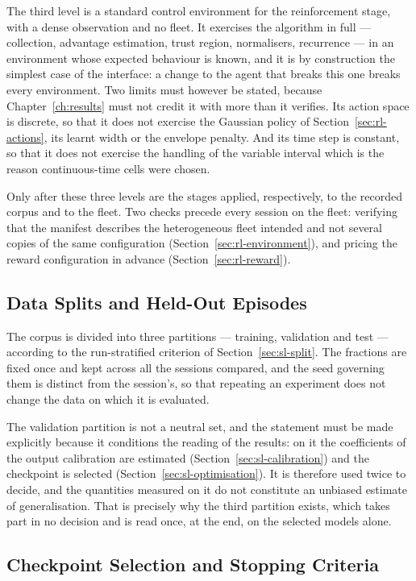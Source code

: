 The third level is a standard control environment for the reinforcement stage,
with a dense observation and no fleet. It exercises the algorithm in full ---
collection, advantage estimation, trust region, normalisers, recurrence --- in
an environment whose expected behaviour is known, and it is by construction the
simplest case of the interface: a change to the agent that breaks this one
breaks every environment. Two limits must however be stated, because
Chapter~\ref{ch:results} must not credit it with more than it verifies. Its
action space is discrete, so that it does not exercise the Gaussian policy of
Section~\ref{sec:rl-actions}, its learnt width or the envelope penalty. And its
time step is constant, so that it does not exercise the handling of the variable
interval which is the reason continuous-time cells were chosen.

Only after these three levels are the stages applied, respectively, to the
recorded corpus and to the fleet. Two checks precede every session on the fleet:
verifying that the manifest describes the heterogeneous fleet intended and not
several copies of the same configuration
(Section~\ref{sec:rl-environment}), and pricing the reward configuration in
advance (Section~\ref{sec:rl-reward}).

\subsection{Data Splits and Held-Out Episodes}

The corpus is divided into three partitions --- training, validation and test
--- according to the run-stratified criterion of Section~\ref{sec:sl-split}. The
fractions are fixed once and kept across all the sessions compared, and the seed
governing them is distinct from the session's, so that repeating an experiment
does not change the data on which it is evaluated.

The validation partition is not a neutral set, and the statement must be made
explicitly because it conditions the reading of the results: on it the
coefficients of the output calibration are estimated
(Section~\ref{sec:sl-calibration}) and the checkpoint is selected
(Section~\ref{sec:sl-optimisation}). It is therefore used twice to decide, and
the quantities measured on it do not constitute an unbiased estimate of
generalisation. That is precisely why the third partition exists, which takes
part in no decision and is read once, at the end, on the selected models alone.

\subsection{Checkpoint Selection and Stopping Criteria}

